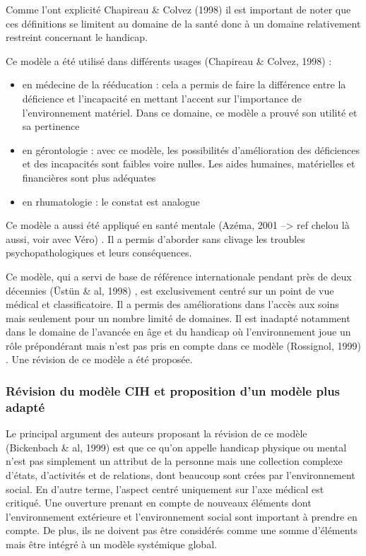 Comme l'ont explicité Chapireau \& Colvez (1998) \cite{ChapireauColvez1998} il est important de noter que ces définitions se limitent au domaine de la santé donc à un domaine relativement restreint concernant le handicap.

Ce modèle a été utilisé dans différents usages (Chapireau \& Colvez, 1998) \cite{ChapireauColvez1998} : 
\begin{itemize}
\item en médecine de la rééducation : cela a permis de faire la différence entre la déficience et l'incapacité en mettant l'accent sur l'importance de l'environnement matériel. Dans ce domaine, ce modèle a prouvé son utilité et sa pertinence
\item en gérontologie : avec ce modèle, les possibilités d'amélioration des déficiences et des incapacités sont faibles voire nulles. Les aides humaines, matérielles et financières sont plus adéquates
\item en rhumatologie : le constat est analogue
\end{itemize}

Ce modèle a aussi été appliqué en santé mentale (Azéma, 2001 --> ref chelou là aussi, voir avec Véro) \cite{RapportAzemaChelou}. Il a permis d'aborder sans clivage les troubles psychopathologiques et leurs conséquences. 

Ce modèle, qui a servi de base de référence internationale pendant près de deux décennies (Üstün \& al, 1998) \cite{Ustun1998}, est exclusivement centré sur un point de vue médical et classificatoire. Il a permis des améliorations dans l'accès aux soins mais seulement pour un nombre limité de domaines. Il est inadapté notamment dans le domaine de l'avancée en âge et du handicap où l'environnement joue un rôle prépondérant mais n'est pas pris en compte dans ce modèle (Rossignol, 1999) \cite {Rossignol1999}. Une révision de ce modèle a été proposée.

\subsubsection{Révision du modèle CIH et proposition d'un modèle plus adapté}

Le principal argument des auteurs proposant la révision de ce modèle (Bickenbach \& al, 1999) \cite{Bickenbach1999} est \og que ce qu’on appelle \og handicap \fg{} physique ou mental n’est pas simplement un attribut de la personne mais une collection complexe d’états, d’activités et de relations, dont beaucoup sont crées par l’environnement social\fg{}. En d'autre terme, l'aspect centré uniquement sur l'axe médical est critiqué. Une ouverture prenant en compte de nouveaux éléments dont l'environnement extérieure et l'environnement social sont important à prendre en compte. De plus, ils ne doivent pas être considérés comme une somme d'éléments mais être intégré à un modèle systémique global.

